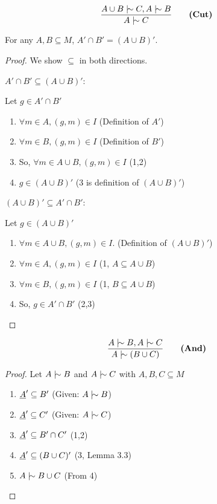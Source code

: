 \documentclass[11pt]{article}
\begin{document}
\begin{equation}
  \frac{A \cup B \twiddle C, A \twiddle B}{A \twiddle C} \qquad \textbf{(Cut)}
\end{equation}

\begin{lemma}
  For any $A, B \subseteq M$, $A' \cap B' = (A \cup B)'$.
\end{lemma}

\begin{proof}
  We show $\subseteq$ in both directions.

  $A' \cap B' \subseteq (A \cup B)'$:

  Let $g \in A' \cap B'$
  \begin{enumerate}
    \item $\forall m \in A, (g,m) \in I$ \hfill (Definition of $A'$)
    \item $\forall m \in B, (g,m) \in I$ \hfill (Definition of $B'$)
    \item So, $\forall m \in A \cup B, (g,m) \in I$ \hfill (1,2)
    \item $g \in (A \cup B)'$ \hfill (3 is definition of $(A \cup B)'$)\\
  \end{enumerate}

  $(A \cup B)' \subseteq A' \cap B'$:

  Let $g \in (A \cup B)'$
  \begin{enumerate}
    \item $\forall m \in A \cup B, (g,m) \in I$. \hfill (Definition of $(A \cup B)'$)
    \item $\forall m \in A, (g,m) \in I$ \hfill (1, $A \subseteq A \cup B$)
    \item $\forall m \in B, (g,m) \in I$ \hfill (1, $B \subseteq A \cup B$)
    \item So, $g \in A' \cap B'$ \hfill(2,3)
  \end{enumerate}
\end{proof}

\begin{equation}
  \frac{A \twiddle B, A \twiddle C}{A \twiddle (B \cup C)} \qquad \textbf{(And)}
\end{equation}

\begin{proof}
  Let $A \twiddle B$ and $A \twiddle C$ with $A, B, C \subseteq M$
  \begin{enumerate}
    \item $\underline{A}' \subseteq B'$ \hfill (Given: $A \twiddle B$)
    \item $\underline{A}' \subseteq C'$ \hfill (Given: $A \twiddle C$)
    \item $\underline{A}' \subseteq B' \cap C'$ \hfill (1,2)
    \item $\underline{A}' \subseteq (B\cup C)'$ \hfill (3, Lemma 3.3)
    \item $A \twiddle B \cup C$ \hfill (From 4)
  \end{enumerate}
\end{proof}
\end{document}
